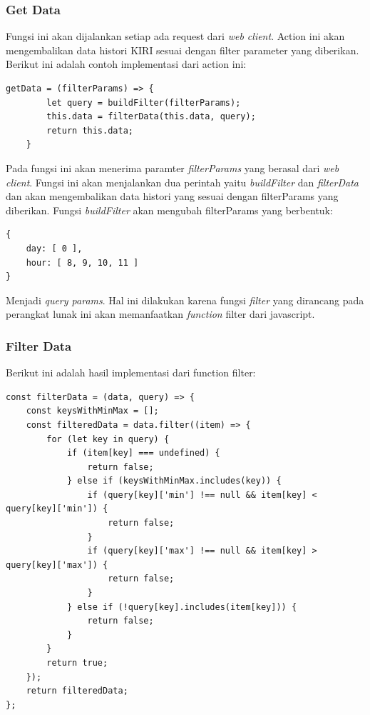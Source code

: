 \subsubsection{Get Data}
Fungsi ini akan dijalankan setiap ada request dari \textit{web client}. Action ini akan mengembalikan data histori KIRI sesuai dengan filter parameter yang diberikan. Berikut ini adalah contoh implementasi dari action ini:
\begin{lstlisting}[label=get_data , caption=Function Get Data]
    getData = (filterParams) => {
        let query = buildFilter(filterParams);
        this.data = filterData(this.data, query);
        return this.data;
    }
\end{lstlisting}
Pada fungsi ini akan menerima paramter \textit{filterParams} yang berasal dari \textit{web client}. Fungsi ini akan menjalankan dua perintah yaitu \textit{buildFilter} dan  \textit{filterData} dan akan mengembalikan data histori yang sesuai dengan filterParams yang diberikan. Fungsi \textit{buildFilter} akan mengubah filterParams  yang berbentuk:
\begin{lstlisting}[label=filter_params , caption=Filter Parameter]
{
    day: [ 0 ], 
    hour: [ 8, 9, 10, 11 ] 
}
\end{lstlisting}
Menjadi \textit{query params}. Hal ini dilakukan karena fungsi \textit{filter} yang dirancang pada perangkat lunak ini akan memanfaatkan \textit{function} filter dari javascript.

\newpage 
\subsubsection{Filter Data}
 Berikut ini adalah hasil implementasi dari function filter:
\begin{lstlisting}[label=filter_method , caption=Fungsi Filter]
 const filterData = (data, query) => {
    const keysWithMinMax = [];
    const filteredData = data.filter((item) => {
        for (let key in query) {
            if (item[key] === undefined) {
                return false;
            } else if (keysWithMinMax.includes(key)) {
                if (query[key]['min'] !== null && item[key] < query[key]['min']) {
                    return false;
                }
                if (query[key]['max'] !== null && item[key] > query[key]['max']) {
                    return false;
                }
            } else if (!query[key].includes(item[key])) {
                return false;
            }
        }
        return true;
    });
    return filteredData;
};
\end{lstlisting}

